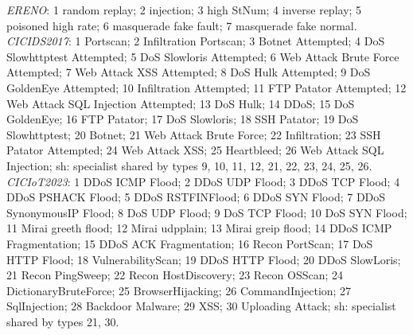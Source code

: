 \emph{ERENO}: 1 random replay; 2 injection; 3 high StNum; 4 inverse replay; 5 poisoned high rate; 6 masquerade fake fault; 7 masquerade fake normal.
\emph{CICIDS2017}: 1 Portscan; 2 Infiltration Portscan; 3 Botnet Attempted; 4 DoS Slowhttptest Attempted; 5 DoS Slowloris Attempted; 6 Web Attack Brute Force Attempted; 7 Web Attack XSS Attempted; 8 DoS Hulk Attempted; 9 DoS GoldenEye Attempted; 10 Infiltration Attempted; 11 FTP Patator Attempted; 12 Web Attack SQL Injection Attempted; 13 DoS Hulk; 14 DDoS; 15 DoS GoldenEye; 16 FTP Patator; 17 DoS Slowloris; 18 SSH Patator; 19 DoS Slowhttptest; 20 Botnet; 21 Web Attack Brute Force; 22 Infiltration; 23 SSH Patator Attempted; 24 Web Attack XSS; 25 Heartbleed; 26 Web Attack SQL Injection; sh: specialist shared by types 9, 10, 11, 12, 21, 22, 23, 24, 25, 26.
\emph{CICIoT2023}: 1 DDoS ICMP Flood; 2 DDoS UDP Flood; 3 DDoS TCP Flood; 4 DDoS PSHACK Flood; 5 DDoS RSTFINFlood; 6 DDoS SYN Flood; 7 DDoS SynonymousIP Flood; 8 DoS UDP Flood; 9 DoS TCP Flood; 10 DoS SYN Flood; 11 Mirai greeth flood; 12 Mirai udpplain; 13 Mirai greip flood; 14 DDoS ICMP Fragmentation; 15 DDoS ACK Fragmentation; 16 Recon PortScan; 17 DoS HTTP Flood; 18 VulnerabilityScan; 19 DDoS HTTP Flood; 20 DDoS SlowLoris; 21 Recon PingSweep; 22 Recon HostDiscovery; 23 Recon OSScan; 24 DictionaryBruteForce; 25 BrowserHijacking; 26 CommandInjection; 27 SqlInjection; 28 Backdoor Malware; 29 XSS; 30 Uploading Attack; sh: specialist shared by types 21, 30.
